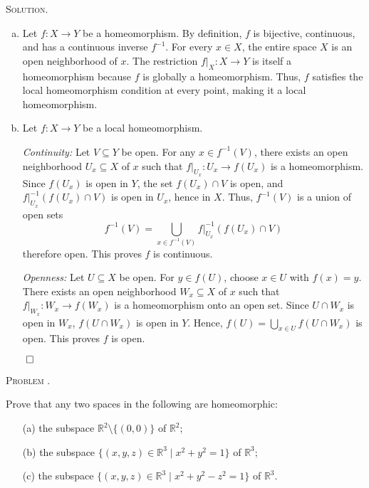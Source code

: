 \documentclass[12pt, a4paper, oneside]{ctexart}
\newcounter{problemname}
\newenvironment{problem}{\begin{framed}\stepcounter{problemname}\par\noindent\textsc{Problem \arabic{problemname}. }}{\end{framed}\par}
\newenvironment{solution}{%
	\par\noindent\textsc{Solution. }\ignorespaces
}{%
	\hfill$\qed$\par
}
\begin{document}
	\begin{solution}
		\begin{enumerate}[(a)]
			\item Let \( f: X \to Y \) be a homeomorphism. By definition, \( f \) is bijective, continuous, and has a continuous inverse \( f^{-1} \). For every \( x \in X \), the entire space \( X \) is an open neighborhood of \( x \). The restriction \( f|_X: X \to Y \) is itself a homeomorphism because \( f \) is globally a homeomorphism. Thus, \( f \) satisfies the local homeomorphism condition at every point, making it a local homeomorphism.
			
			
			\item Let \( f: X \to Y \) be a local homeomorphism.
			
			\textit{Continuity:} Let \( V \subseteq Y \) be open. For any \( x \in f^{-1}(V) \), there exists an open neighborhood \( U_x \subseteq X \) of \( x \) such that \( f|_{U_x}: U_x \to f(U_x) \) is a homeomorphism. Since \( f(U_x) \) is open in \( Y \), the set \( f(U_x) \cap V \) is open, and \( f|_{U_x}^{-1}(f(U_x) \cap V) \) is open in \( U_x \), hence in \( X \). Thus, \( f^{-1}(V) \) is a union of open sets \[ f^{-1}(V) = \bigcup_{x\in f^{-1}(V)} f|_{U_{x}}^{-1}(f(U_{x})\cap V)
			 \] therefore open. This proves \( f \) is continuous.
			
			\textit{Openness:} Let \( U \subseteq X \) be open. For \( y \in f(U) \), choose \( x \in U \) with \( f(x) = y \). There exists an open neighborhood \( W_x \subseteq X \) of \( x \) such that \( f|_{W_x}: W_x \to f(W_x) \) is a homeomorphism onto an open set. Since \( U \cap W_x \) is open in \( W_x \), \( f(U \cap W_x) \) is open in \( Y \). Hence, \( f(U) = \bigcup_{x \in U} f(U \cap W_x) \) is open. This proves \( f \) is open.
		\end{enumerate}
		
	\end{solution}
	
	\begin{problem}
		
		
	Prove that any two spaces in the following are homeomorphic:
	\begin{itemize}
		\item[(a)] the subspace $\mathbb{R}^2 \setminus \{(0,0)\}$ of $\mathbb{R}^2$;
		\item[(b)] the subspace $\{(x, y, z) \in \mathbb{R}^3 \mid x^2 + y^2 = 1\}$ of $\mathbb{R}^3$;
		\item[(c)] the subspace $\{(x, y, z) \in \mathbb{R}^3 \mid x^2 + y^2 - z^2 = 1\}$ of $\mathbb{R}^3$.
	\end{itemize}
	
	\end{problem}
	
\end{document}
